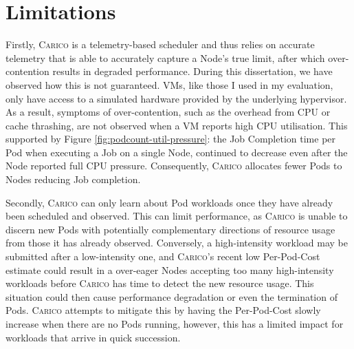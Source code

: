 \section{Limitations}

Firstly, \textsc{Carico} is a telemetry-based scheduler and thus relies on accurate
telemetry that is able to accurately capture a Node's true limit, after which
over-contention results in degraded performance. During this dissertation, we
have observed how this is not guaranteed. VMs, like those I used in my
evaluation, only have access to a simulated hardware provided by the underlying
hypervisor. As a result, symptoms of over-contention, such as the overhead from
CPU or cache thrashing, are not observed when a VM reports high CPU utilisation.
This supported by Figure \ref{fig:podcount-util-pressure}: the Job Completion
time per Pod when executing a Job on a single Node, continued to decrease even
after the Node reported full CPU pressure. Consequently, \textsc{Carico}
allocates fewer Pods to Nodes reducing Job completion.

Secondly, \textsc{Carico} can only learn about Pod workloads once they have
already been scheduled and observed. This can limit performance, as
\textsc{Carico} is unable to discern new Pods with potentially complementary directions
of resource usage from those it has already observed. Conversely, a
high-intensity workload may be submitted after a low-intensity one, and
\textsc{Carico}'s recent low Per-Pod-Cost estimate could result in a over-eager
Nodes accepting too many high-intensity workloads before \textsc{Carico} has
time to detect the new resource usage. This situation could then cause
performance degradation or even the termination of Pods. \textsc{Carico}
attempts to mitigate this by having the Per-Pod-Cost slowly increase when there
are no Pods running, however, this has a limited impact for workloads that
arrive in quick succession.
